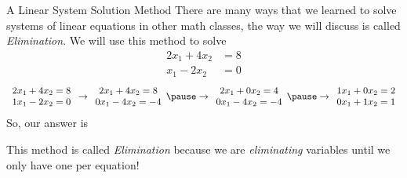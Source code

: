 \documentclass[xcoler=dvipsnames, aspectratio=169]{beamer}
\begin{document}
\begin{frame}{A Linear System Solution Method}
    There are many ways that we learned to solve systems of linear equations in other math classes,
    the way we will discuss is called \textit{Elimination}. We will use this method to solve
        \begin{align*}
            2x_1 + 4x_2 &= 8 \\
            x_1 - 2x_2 &= 0
        \end{align*}
        \pause
    \[
        \begin{array}{c}
            2x_1 + 4x_2 = 8 \\
            1x_1 - 2x_2 = 0
        \end{array} 
        \rightarrow 
        \begin{array}{c}
            2x_1 + 4x_2 = 8 \\
            0x_1 - 4x_2 = -4
        \end{array}
        \pause
        \rightarrow
        \begin{array}{c}
            2x_1 + 0x_2 = 4\\
            0x_1 - 4x_2 = -4
        \end{array}
        \pause
        \rightarrow
        \begin{array}{c}
            1x_1 + 0x_2 = 2\\
            0x_1 + 1x_2 = 1
        \end{array}
    \]
    \pause
    So, our answer is 
    \pause
    \begin{rem}
        This method is called \textit{Elimination} because we are \textit{eliminating} variables until we
        only have one per equation!
    \end{rem}

\end{frame}
\end{document}
